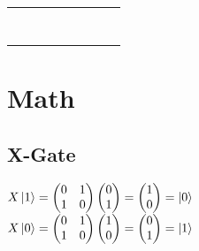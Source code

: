 \documentclass[a4]{article}
\begin{document}
\begin{center}
\begin{tabular}{|c|c|c|c|c|c|c|c|}
  \hline
    &   &   &   &   &   &   &  \\\hline
    &   &   &   &   &   & \cellcolor{red!50}  &  \\\hline
    &   &   &   &   &   &   &  \\\hline
    &   &   &   &   &   & \cellcolor{red!100}  &  \\\hline
    &   & \cellcolor{red!100}  & \cellcolor{red!100}  & \cellcolor{red!100}  & \cellcolor{red!100}  & \cellcolor{red!100}  &  \\\hline
    &   & \cellcolor{red!100}  &   &   &   &   &  \\\hline
    &   & \cellcolor{red!100}  &   &   &   &   &  \\\hline
    &   &   &   &   &   &   &  \\
  \hline
\end{tabular}
\end{center}





\section{Math}

\subsection{X-Gate}
\begin{center}
$X\ket{1} = \begin{pmatrix}0 & 1\\1 & 0\end{pmatrix}\begin{pmatrix}0\\1\end{pmatrix} = \begin{pmatrix}1\\0\end{pmatrix} = \ket{0}$\\\vspace{5mm}
$X\ket{0} = \begin{pmatrix}0 & 1\\1 & 0\end{pmatrix}\begin{pmatrix}1\\0\end{pmatrix} = \begin{pmatrix}0\\1\end{pmatrix} = \ket{1}$
\end{center}
\end{document}
